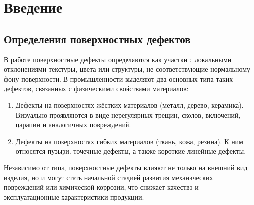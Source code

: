 \documentclass[14pt,a4paper]{article}
\begin{document}
\begin{abstract}
В последнее время глубокое обучение доказало свою исключительную эффективность в таких задачах, как обнаружение и классификация объектов, распознавание лиц, идентификация образов, диагностика неисправностей, отслеживание целей и множестве других приложений, связанных с обработкой изображений. Модели глубоких нейронных сетей демонстрируют высокую устойчивость к изменению условий съёмки — фону, освещённости, цветовой гаммы, формы и размеров объектов, варьирующей интенсивности изображения. Эти свойства особенно важны при обнаружении сложных поверхностных дефектов, характерных для промышленных условий, где изображения могут быть зашумлены, иметь низкое качество или быть сняты при непостоянных параметрах окружающей среды.  Помимо простого выявления наличия дефекта, современные системы нередко требуют точной оценки его параметров: размеров, формы, протяжённости и типа. Такие возможности особенно востребованы в задачах визуального контроля качества продукции и автоматизации производственных процессов.

Целями настоящего обзора являются анализ существующих подходов к решению задач обнаружения аномалий на изображениях с использованием методов глубокого обучения, выявление их преимуществ и ограничений, а также обоснование выбора методик и формулировка целей собственного исследования в рамках подготовки магистерской диссертации. Проведённый обзор позволит определить наиболее перспективные направления развития алгоритмов визуального контроля и сформировать основу для построения собственной экспериментальной методологии.
\end{abstract}

\section{Введение}
\subsection*{Определения поверхностных дефектов}

В работе \cite{Hutten2024} поверхностные дефекты определяются как участки с локальными отклонениями текстуры, цвета или структуры, не соответствующие нормальному фону поверхности. В промышленности выделяют два основных типа таких дефектов, связанных с физическими свойствами материалов:
\begin{enumerate}
	\item Дефекты на поверхностях жёстких материалов (металл, дерево, керамика). Визуально проявляются в виде нерегулярных трещин, сколов, включений, царапин и аналогичных повреждений.

	\item Дефекты на поверхностях гибких материалов (ткань, кожа, резина). К ним относятся пузыри, точечные дефекты, а также короткие линейные дефекты.
\end{enumerate}
Независимо от типа, поверхностные дефекты влияют не только на внешний вид изделия, но и могут стать начальной стадией развития механических повреждений или химической коррозии, что снижает качество и эксплуатационные характеристики продукции.
\end{document}
